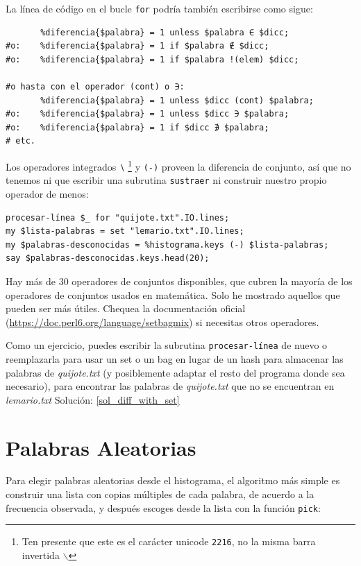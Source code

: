 La línea de código en el bucle {\tt for} podría también
escribirse como sigue:
\begin{verbatim}
       %diferencia{$palabra} = 1 unless $palabra ∈ $dicc;
#o:    %diferencia{$palabra} = 1 if $palabra ∉ $dicc;
#o:    %diferencia{$palabra} = 1 if $palabra !(elem) $dicc;

#o hasta con el operador (cont) o ∋:
       %diferencia{$palabra} = 1 unless $dicc (cont) $palabra;
#o:    %diferencia{$palabra} = 1 unless $dicc ∋ $palabra;
#o:    %diferencia{$palabra} = 1 if $dicc ∌ $palabra;
# etc.
\end{verbatim}

Los operadores integrados \verb|∖| \footnote{Ten presente que 
este es el carácter unicode {\tt 2216}, no la misma barra
invertida $\backslash$} y \verb|(-)| proveen la diferencia de
conjunto, así que no tenemos ni que escribir una subrutina {\tt sustraer}
ni construir nuestro propio operador de menos:

\begin{verbatim}
procesar-línea $_ for "quijote.txt".IO.lines; 
my $lista-palabras = set "lemario.txt".IO.lines;
my $palabras-desconocidas = %histograma.keys (-) $lista-palabras;
say $palabras-desconocidas.keys.head(20);
\end{verbatim}

Hay más de 30 operadores de conjuntos disponibles, que cubren la
mayoría de los operadores de conjuntos usados en matemática. 
Solo he mostrado aquellos que pueden ser más útiles. Chequea
la documentación oficial (\url{https://doc.perl6.org/language/setbagmix}) 
si necesitas otros operadores.

\label{diff_with_set}
Como un ejercicio, puedes escribir la subrutina {\tt procesar-línea}
de nuevo o reemplazarla para usar un set o un bag en lugar de un hash
para almacenar las palabras de \emph{quijote.txt} (y posiblemente adaptar
el resto del programa donde sea necesario), para encontrar las palabras
de \emph{quijote.txt} que no se encuentran en \emph{lemario.txt}
Solución: \ref{sol_diff_with_set}


\section{Palabras Aleatorias}
\label{randomwords}

Para elegir palabras aleatorias desde el histograma, el algoritmo más
simple es construir una lista con copias múltiples de cada palabra,
de acuerdo a la frecuencia observada, y después escoges desde la
lista con la función \verb|pick|:

